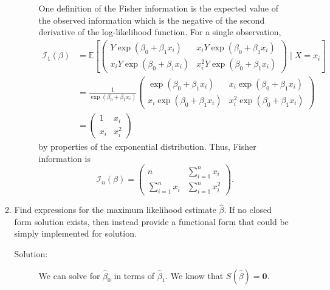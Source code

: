 \documentclass[letterpaper,11pt]{article}
\begin{document}
\begin{enumerate}
\begin{enumerate}
\begin{description}
      One definition of the Fisher information is the expected value of the
      observed information which is the negative of the second derivative of the
      log-likelihood function. For a single observation,
      \begin{align}
        \mathcal{I}_1\left(\beta\right) &= \mathbb{E}\left[          
          \begin{pmatrix}
            Y\exp\left(\beta_0 + \beta_1x_i\right)
            & x_iY\exp\left(\beta_0 + \beta_1x_i\right) \\
            x_iY\exp\left(\beta_0 + \beta_1x_i\right) &
            x_i^2Y\exp\left(\beta_0 + \beta_1x_i\right)
          \end{pmatrix} \mid X = x_i\right] \nonumber\\
        &= \frac{1}{\exp\left(\beta_0 + \beta_1x_i\right)} \begin{pmatrix}
          \exp\left(\beta_0 + \beta_1x_i\right)
          & x_i\exp\left(\beta_0 + \beta_1x_i\right) \\
          x_i\exp\left(\beta_0 + \beta_1x_i\right) &
          x_i^2\exp\left(\beta_0 + \beta_1x_i\right)
        \end{pmatrix} \nonumber\\
        &= \begin{pmatrix}
          1 & x_i \\
          x_i & x_i^2
        \end{pmatrix}
        \label{eqn:p2_fisher_information_single}      
      \end{align}
      by properties of the exponential distribution. Thus, Fisher information is
      \begin{equation}
        \mathcal{I}_n\left(\beta\right) =
        \begin{pmatrix}
          n & \sum_{i=1}^n x_i \\
          \sum_{i=1}^n x_i & \sum_{i=1}^n x_i^2
        \end{pmatrix}.
        \label{eqn:p2_fisher_information}
      \end{equation}
    \end{description}
  \item Find expressions for the maximum likelihood estimate $\hat{\beta}$. If
    no closed form solution exists, then instead provide a functional form that
    could be simply implemented for solution.

    \begin{description}
    \item[Solution:] We can solve for $\hat{\beta}_0$ in terms of
      $\hat{\beta}_1$. We know that $S\left(\hat{\beta}\right) = \mathbf{0}$.


\end{description}
\end{enumerate}
\end{enumerate}
\end{document}
